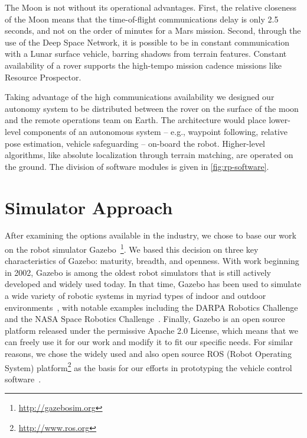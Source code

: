 \documentclass[twocolumn,letterpaper]{IEEEAerospaceCLS}  %
\begin{document}
The Moon is not without its operational advantages.
First, the relative closeness of the Moon means that the time-of-flight communications delay is only 2.5 seconds, and not on the order of minutes for a Mars mission.  
Second, through the use of the Deep Space Network, it is possible to be in constant communication with a Lunar surface vehicle, barring shadows from terrain features.  
Constant availability of a rover supports the high-tempo mission cadence missions like Resource Prospector.

Taking advantage of the high communications availability we designed our autonomy system to be distributed between the rover on the surface of the moon and the remote operations team on Earth.  
The architecture would place lower-level components of an autonomous system -- e.g., waypoint following, relative pose estimation, vehicle safeguarding -- on-board the robot.
Higher-level algorithms, like absolute localization through terrain matching, are operated on the ground.
The division of software modules is given in \cref{fig:rp-software}.


\section{Simulator Approach}
\label{sec:sim-approach}

After examining the options available in the industry, we chose to base our work on the robot simulator Gazebo~\cite{koenig2004design}\footnote{\url{http://gazebosim.org}}.
We based this decision on three key characteristics of Gazebo: maturity, breadth, and openness.
With work beginning in 2002, Gazebo is among the oldest robot simulators that is still actively developed and widely used today.
In that time, Gazebo has been used to simulate a wide variety of robotic systems in myriad types of indoor and outdoor environments~\cite{paepcke2016gazebo}, with notable examples including the DARPA Robotics Challenge~\cite{aguero2015inside} and the NASA Space Robotics Challenge~\cite{hambuchen2017nasa}.
Finally, Gazebo is an open source platform released under the permissive Apache 2.0 License, which means that we can freely use it for our work and modify it to fit our specific needs.
For similar reasons, we chose the widely used and also open source ROS (Robot Operating System) platform\footnote{\url{http://www.ros.org}} as the basis for our efforts in prototyping the vehicle control software~\cite{quigley2009ros}.
\end{document}

